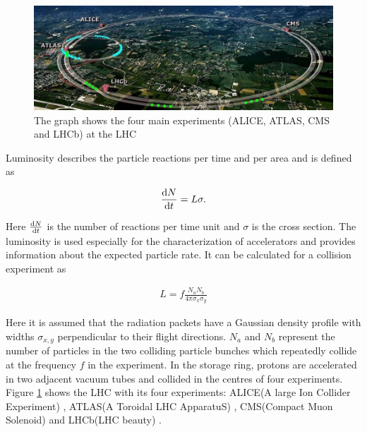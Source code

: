 \documentclass[12pt, a4paper]{thesis}
\begin{document}
\begin{figure}[H]
\centering
\includegraphics[width=\textwidth]{../images/lhc.jpeg}
\caption{The graph shows the four main experiments (ALICE, ATLAS, CMS and LHCb) at the LHC \cite{lhcmap}}
\label{4experiments}
\end{figure}



Luminosity describes the particle reactions per time and per area and is defined
as

\begin{align}
\dv{N}{t} = L \sigma.
\end{align}

Here \(\dv{N}{t}\) is the number of reactions per time unit and
$\sigma$ is the cross section.  The luminosity is used especially for
the characterization of accelerators and provides information about
the expected particle rate. It can be calculated for a collision
experiment as

\begin{align}
L = f \frac{N_{a}N_{b}}{4 \pi \sigma_{x} \sigma_{y}}
\end{align}

Here it is assumed that the radiation packets have a Gaussian density
profile with widths \(\sigma_{x,y}\) perpendicular to their flight
directions.  \(N_{a}\) and \(N_{b}\) represent the number of particles in
the two colliding particle bunches which repeatedly collide at the
frequency \(f\) in the experiment.  In the storage ring, protons are
accelerated in two adjacent vacuum tubes and collided in the centres
of four experiments. Figure \ref{4experiments} shows the LHC with its
four experiments: ALICE(A large Ion Collider Experiment) \cite{alice},
ATLAS(A Toroidal LHC ApparatuS) \cite{atlas}, CMS(Compact Muon
Solenoid) \cite{cms} and LHCb(LHC beauty) \cite{lhcb}.
\end{document}
